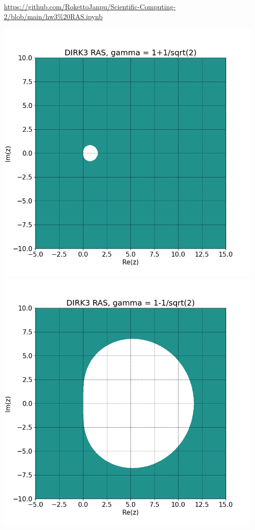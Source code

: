 \documentclass{article}
\newcommand{\sep}[1][.5cm]{\vspace{#1}}
\begin{document}
\begin{enumerate}
\url{https://github.com/RokettoJanpu/Scientific-Computing-2/blob/main/hw3%20RAS.ipynb}

\begin{center}
\includegraphics[scale=.3]{hw3 dirk3 ras 1}
\includegraphics[scale=.3]{hw3 dirk3 ras 2}
\end{center}

\end{enumerate}
\sep
\end{document}
